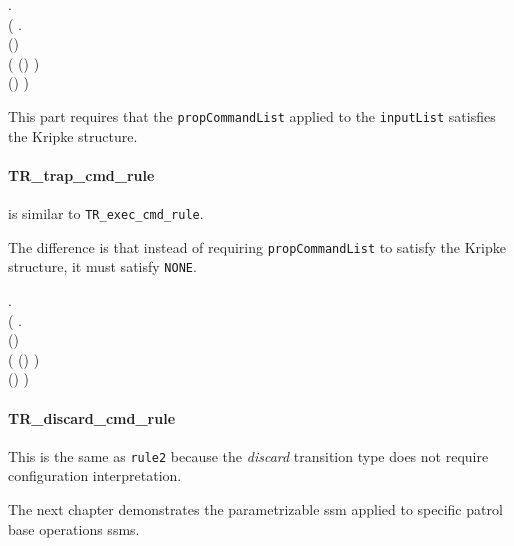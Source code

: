 \documentclass[../../main/main.tex]{subfiles}
\begin{document}
\HOLTokenTurnstile{} 
\HOLSymConst{\HOLTokenForall{}}      .\\
\hspace{0.5cm}(\HOLSymConst{\HOLTokenForall{}}  .\\
\hspace{0.9cm} (\HOLSymConst{,}\HOLSymConst{,})\\
\hspace{1.1cm}( 
(\HOLSymConst{::}) 
) \\
\HOLSymConst{\HOLTokenImp{}}(\HOLSymConst{,}\HOLSymConst{,})   ) 

This part requires that the \texttt{propCommandList} applied to the \texttt{inputList} satisfies the Kripke structure.

\paragraph*{TR_trap_cmd_rule}

 is similar to \texttt{TR_exec_cmd_rule}. 

\HOLssmTheoremsTRXXtrapXXcmdXXrule

The difference is that instead of requiring \texttt{propCommandList} to satisfy the Kripke structure, it must satisfy \texttt{NONE}.  

\HOLTokenTurnstile{} 
\HOLSymConst{\HOLTokenForall{}}      .\\
\hspace{0.5cm} (\HOLSymConst{\HOLTokenForall{}}  .\\
\hspace{0.9cm} (\HOLSymConst{,}\HOLSymConst{,})\\
\hspace{1.1cm}( 
(\HOLSymConst{::}) 
) \\
\HOLSymConst{\HOLTokenImp{}} (\HOLSymConst{,}\HOLSymConst{,})   ) 



\paragraph*{TR_discard_cmd_rule}

This is the same as \texttt{rule2} because the \textit{discard} transition type does not require configuration interpretation.


The next chapter demonstrates the parametrizable ssm applied to specific patrol base operations \glspl{ssm}.
\end{document}
